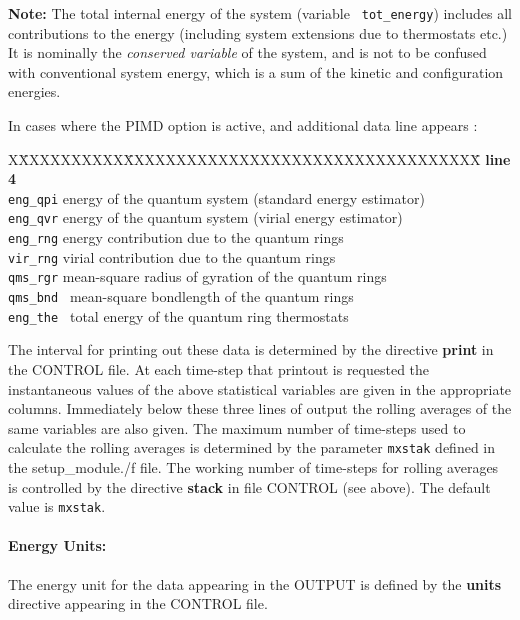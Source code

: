 {\bf Note:} The total internal energy of the system (variable {\tt
tot\_energy}) includes all contributions to the energy (including
system extensions due to thermostats etc.) It is nominally the {\em
conserved variable} of the system, and is not to be confused with
conventional system energy, which is a sum of the kinetic and
configuration energies.

In cases where the PIMD option is active, and additional data line
appears :
\begin{tabbing}
X\=XXXXXXXXXX\=XXXXXXXXXXXXXXXXXXXXXXXXXXXXXXXXXX\=\kill
{\bf line 4}\\
\> {\tt eng\_qpi} \> energy of the quantum system (standard energy estimator)\\
\> {\tt eng\_qvr} \> energy of the quantum system (virial energy estimator)\\
\> {\tt eng\_rng} \> energy contribution due to the quantum rings\\
\> {\tt vir\_rng} \> virial contribution due to the quantum rings\\
\> {\tt qms\_rgr} \> mean-square radius of gyration of the quantum rings\\
\> {\tt qms\_bnd } \> mean-square bondlength of the quantum rings\\
\> {\tt eng\_the } \> total energy of the quantum ring thermostats\\
\end{tabbing}

The interval for printing out these data is determined by the
directive {\bf print} in the CONTROL file.  At each time-step that
printout is requested the instantaneous values of the above
statistical variables are given in the appropriate columns.
Immediately below these three lines of output the rolling averages of
the same variables are also given. The maximum number of
time-steps used to calculate the
rolling averages is determined by the parameter {\tt mxstak} defined
in the {\sc setup\_module./f} file.
The working number of time-steps for rolling averages
is controlled by the directive {\bf stack} in file CONTROL (see
above).  The default value is {\tt mxstak}.

\paragraph*{Energy Units:}

The energy unit for the data appearing in the OUTPUT is defined by the
{\bf units} directive appearing in the CONTROL file. 

